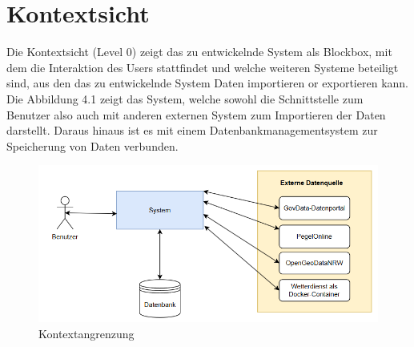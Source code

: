 \documentclass[a4paper,12pt]{scrreprt}
\begin{document}
\section*{\large \textbf{Kontextsicht}}
Die Kontextsicht (Level 0) zeigt das zu entwickelnde System als Blockbox, mit dem die Interaktion des Users stattfindet und welche weiteren Systeme beteiligt sind, aus den das zu entwickelnde System Daten importieren or exportieren kann.\\
Die Abbildung 4.1 zeigt das System, welche sowohl die Schnittstelle zum Benutzer  also auch mit anderen externen System zum Importieren der Daten darstellt. Daraus hinaus ist es mit einem Datenbankmanagementsystem zur Speicherung von Daten verbunden.
\begin{figure}[H]
	\centering
	\includegraphics[width=12cm]{Kontextangrenzung.png}
	\caption{\label{} Kontextangrenzung}
\end{figure}
\end{document}
